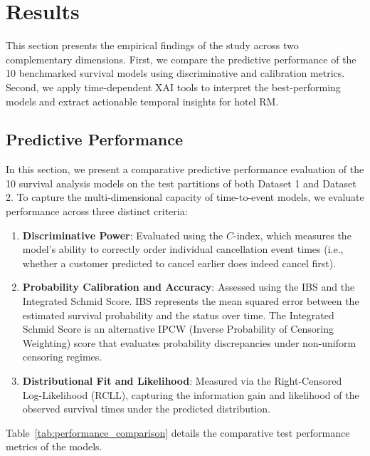 \documentclass[pdflatex,sn-mathphys-ay]{sn-jnl}%
\theoremstyle{thmstyleone}%
\theoremstyle{thmstyletwo}%
\theoremstyle{thmstylethree}%
\begin{document}
\section{Results} %


This section presents the empirical findings of the study across two complementary dimensions. First, we compare the predictive performance of the 10 benchmarked survival models using discriminative and calibration metrics. Second, we apply time-dependent XAI tools to interpret the best-performing models and extract actionable temporal insights for hotel RM.

\subsection{Predictive Performance}

In this section, we present a comparative predictive performance evaluation of the 10 survival analysis models on the test partitions of both Dataset 1 and Dataset 2. To capture the multi-dimensional capacity of time-to-event models, we evaluate performance across three distinct criteria:
\begin{enumerate}
\item \textbf{Discriminative Power}: Evaluated using the $C$-index, which measures the model's ability to correctly order individual cancellation event times (i.e., whether a customer predicted to cancel earlier does indeed cancel first).
\item \textbf{Probability Calibration and Accuracy}: Assessed using the IBS and the Integrated Schmid Score. IBS represents the mean squared error between the estimated survival probability and the status over time. The Integrated Schmid Score is an alternative IPCW (Inverse Probability of Censoring Weighting) score that evaluates probability discrepancies under non-uniform censoring regimes.
\item \textbf{Distributional Fit and Likelihood}: Measured via the Right-Censored Log-Likelihood (RCLL), capturing the information gain and likelihood of the observed survival times under the predicted distribution.
\end{enumerate}

Table~\ref{tab:performance_comparison} details the comparative test performance metrics of the models.
\end{document}
